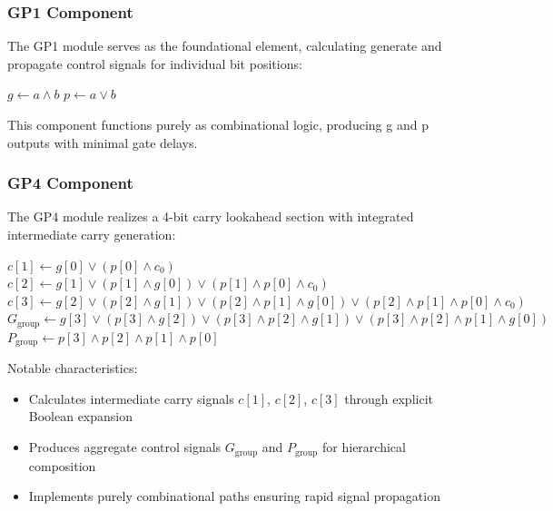 \documentclass[a4paper, 11pt]{article}
\begin{document}
\subsubsection{GP1 Component}

The GP1 module serves as the foundational element, calculating generate and propagate control signals for individual bit positions:

\begin{algorithm}[H]
\SetAlgoLined
{}
$g \gets a \land b$ 
$p \gets a \lor b$ 
\caption{GP1 Component: Bit-Level Generate/Propagate}
\end{algorithm}

This component functions purely as combinational logic, producing g and p outputs with minimal gate delays.

\subsubsection{GP4 Component}

The GP4 module realizes a 4-bit carry lookahead section with integrated intermediate carry generation:

\begin{algorithm}[H]
\SetAlgoLined
{}
$c[1] \gets g[0] \lor (p[0] \land c_0)$\\
$c[2] \gets g[1] \lor (p[1] \land g[0]) \lor (p[1] \land p[0] \land c_0)$\\
$c[3] \gets g[2] \lor (p[2] \land g[1]) \lor (p[2] \land p[1] \land g[0]) \lor (p[2] \land p[1] \land p[0] \land c_0)$\\
$G_{\text{group}} \gets g[3] \lor (p[3] \land g[2]) \lor (p[3] \land p[2] \land g[1]) \lor (p[3] \land p[2] \land p[1] \land g[0])$\\
$P_{\text{group}} \gets p[3] \land p[2] \land p[1] \land p[0]$\\
\caption{GP4 Component: 4-bit Carry Lookahead Logic}
\end{algorithm}

Notable characteristics:
\begin{itemize}
    \item Calculates intermediate carry signals $c[1]$, $c[2]$, $c[3]$ through explicit Boolean expansion
    \item Produces aggregate control signals $G_{\text{group}}$ and $P_{\text{group}}$ for hierarchical composition
    \item Implements purely combinational paths ensuring rapid signal propagation
\end{itemize}
\end{document}
